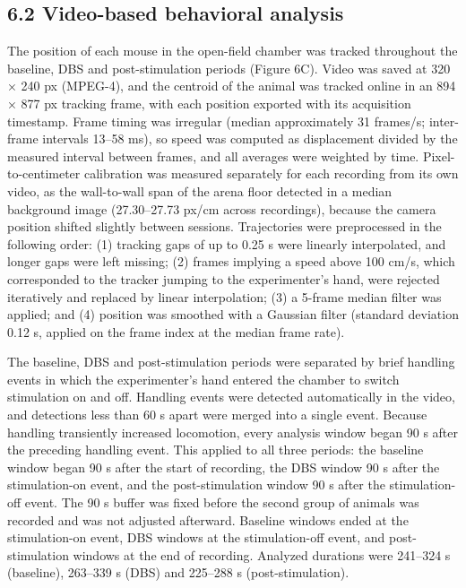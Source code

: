 \subsection{6.2 Video-based behavioral analysis}\label{video-based-behavioral-analysis}

The position of each mouse in the open-field chamber was tracked throughout the baseline, DBS and post-stimulation periods (Figure 6C). Video was saved at 320 × 240 px (MPEG-4), and the centroid of the animal was tracked online in an 894 × 877 px tracking frame, with each position exported with its acquisition timestamp. Frame timing was irregular (median approximately 31 frames/s; inter-frame intervals 13--58 ms), so speed was computed as displacement divided by the measured interval between frames, and all averages were weighted by time. Pixel-to-centimeter calibration was measured separately for each recording from its own video, as the wall-to-wall span of the arena floor detected in a median background image (27.30--27.73 px/cm across recordings), because the camera position shifted slightly between sessions. Trajectories were preprocessed in the following order: (1) tracking gaps of up to 0.25 s were linearly interpolated, and longer gaps were left missing; (2) frames implying a speed above 100 cm/s, which corresponded to the tracker jumping to the experimenter's hand, were rejected iteratively and replaced by linear interpolation; (3) a 5-frame median filter was applied; and (4) position was smoothed with a Gaussian filter (standard deviation 0.12 s, applied on the frame index at the median frame rate).

The baseline, DBS and post-stimulation periods were separated by brief handling events in which the experimenter's hand entered the chamber to switch stimulation on and off. Handling events were detected automatically in the video, and detections less than 60 s apart were merged into a single event. Because handling transiently increased locomotion, every analysis window began 90 s after the preceding handling event. This applied to all three periods: the baseline window began 90 s after the start of recording, the DBS window 90 s after the stimulation-on event, and the post-stimulation window 90 s after the stimulation-off event. The 90 s buffer was fixed before the second group of animals was recorded and was not adjusted afterward. Baseline windows ended at the stimulation-on event, DBS windows at the stimulation-off event, and post-stimulation windows at the end of recording. Analyzed durations were 241--324 s (baseline), 263--339 s (DBS) and 225--288 s (post-stimulation).

